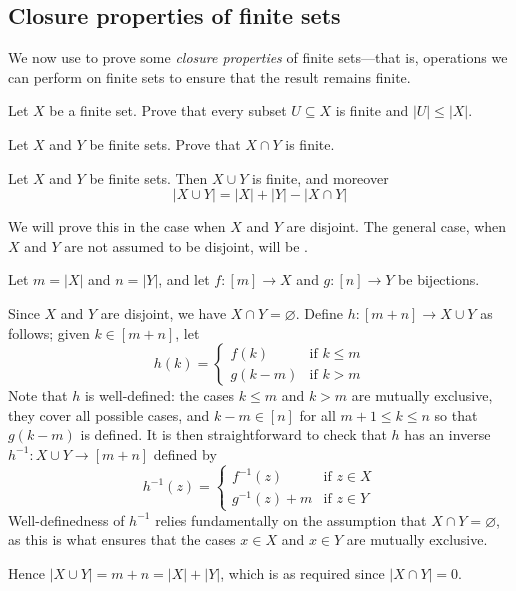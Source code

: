 \subsection*{Closure properties of finite sets}

We now use  to prove some \textit{closure properties} of finite sets---that is, operations we can perform on finite sets to ensure that the result remains finite.

\begin{exercise}
Let $X$ be a finite set. Prove that every subset $U \subseteq X$ is finite and $|U| \le |X|$.
\end{exercise}

\begin{exercise}
Let $X$ and $Y$ be finite sets. Prove that $X \cap Y$ is finite.
\end{exercise}

\begin{proposition}
\label{propUnionOfFiniteSetsIsFinite}
Let $X$ and $Y$ be finite sets. Then $X \cup Y$ is finite, and moreover
\[ |X \cup Y| = |X| + |Y| - |X \cap Y| \]
\end{proposition}

\begin{cproof}
We will prove this in the case when $X$ and $Y$ are disjoint. The general case, when $X$ and $Y$ are not assumed to be disjoint, will be .

Let $m = |X|$ and $n=|Y|$, and let $f : [m] \to X$ and $g : [n] \to Y$ be bijections.

Since $X$ and $Y$ are disjoint, we have $X \cap Y = \varnothing$. Define $h : [m+n] \to X \cup Y$ as follows; given $k \in [m+n]$, let
\[ h(k) = \begin{cases} f(k) & \text{if } k \le m \\ g(k-m) & \text{if } k > m \end{cases} \]
Note that $h$ is well-defined: the cases $k \le m$ and $k > m$ are mutually exclusive, they cover all possible cases, and $k-m \in [n]$ for all $m+1 \le k \le n$ so that $g(k-m)$ is defined. It is then straightforward to check that $h$ has an inverse $h^{-1} : X \cup Y \to [m+n]$ defined by
\[ h^{-1}(z) = \begin{cases} f^{-1}(z) & \text{if } z \in X \\ g^{-1}(z)+m & \text{if } z \in Y \end{cases} \]
Well-definedness of $h^{-1}$ relies fundamentally on the assumption that $X \cap Y = \varnothing$, as this is what ensures that the cases $x \in X$ and $x \in Y$ are mutually exclusive.

Hence $|X \cup Y| = m+n = |X| + |Y|$, which is as required since $|X \cap Y| = 0$.
\end{cproof}

